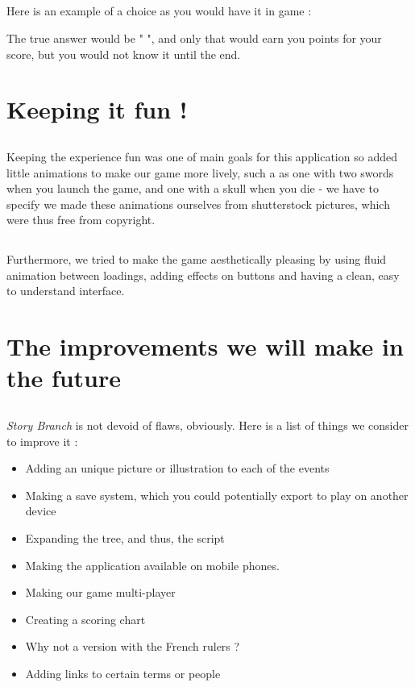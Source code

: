 \documentclass{scrreprt}
\begin{document}
\newpage
\subsection*{} Here is an example of a choice as you would have it in game :




The true answer would be " ", and only that would earn you points for your score, but you would not know it until the end.


\section{Keeping it fun !}

\subsection*{} Keeping the experience fun was one of main goals for this application so added little animations to make our game more lively, such a as one with two swords when you launch the game, and one with a skull when you die - we have to specify we made these animations ourselves from shutterstock pictures, which were thus free from copyright.

\subsection*{}Furthermore, we tried to make the game aesthetically pleasing by using fluid animation between loadings, adding effects on buttons and having a clean, easy to understand interface.

\newpage
\section{The improvements we will make in the future}
\subsection*{}
\textit{Story Branch} is not devoid of flaws, obviously. Here is a list of things we consider to improve it :
\begin{itemize}
\item Adding an unique picture or illustration to each of the events
\item Making a save system, which you could potentially export to play on another device
\item Expanding the tree, and thus, the script
\item Making the application available on mobile phones.
\item Making our game multi-player
\item Creating a scoring chart
\item Why not a version with the French rulers ?
\item Adding links to certain terms or people
\end{itemize}
\end{document}
